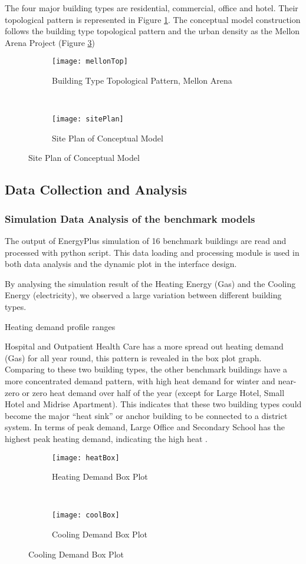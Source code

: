 \documentclass[hidelinks,12pt]{article}
\newcommand{\fref}[1]{Figure \ref{#1}}
\begin{document}
The four major building types are residential, commercial, office and
hotel. Their topological pattern is represented in Figure
\ref{fig:mellonTop}. The conceptual model construction follows the
building type topological pattern and the urban density as the Mellon
Arena Project (\fref{fig:sitePlan})
\begin{figure}[h!]
  \centering
  \begin{subfigure}
  \centering
  \texttt{[image: mellonTop]}
  \caption{Building Type Topological Pattern, Mellon Arena}
  \label{fig:mellonTop}
  \end{subfigure}
  ~
  \begin{subfigure}
  \centering
  \texttt{[image: sitePlan]}
  \caption{Site Plan of Conceptual Model}
  \label{fig:sitePlan}
  \end{subfigure}
\end{figure}   

\subsection{Data Collection and Analysis}
\subsubsection{Simulation Data Analysis of the benchmark models}
The output of EnergyPlus simulation of 16 benchmark buildings are read
and processed with python script. This data loading and processing
module is used in both data analysis and the dynamic plot in the
interface design.

By analysing the simulation result of the Heating Energy (Gas) and the
Cooling Energy (electricity), we observed a large variation between
different building types.

Heating demand profile ranges

Hospital and Outpatient Health Care has a more spread out heating
demand (Gas) for all year round, this pattern is revealed in the
box plot graph. Comparing to these two building types, the other
benchmark buildings have a more concentrated demand pattern, with high
heat demand for winter and near-zero or zero heat demand over half of
the year (except for Large Hotel, Small Hotel and Midrise
Apartment). This indicates that these two building types could become
the major ``heat sink'' or anchor building to be connected to a
district system. In terms of peak demand, Large Office and Secondary
School has the highest peak heating demand, indicating the high heat .
\begin{figure}[h!]
  \centering
  \begin{subfigure}
  \centering
  \texttt{[image: heatBox]}
  \caption{Heating Demand Box Plot}
  \label{fig:heatBox}
  \end{subfigure}%
  ~
  \begin{subfigure}
  \centering
  \texttt{[image: coolBox]}
  \caption{Cooling Demand Box Plot}
  \label{fig:coolBox}
  \end{subfigure}
\end{figure}   
\end{document}
